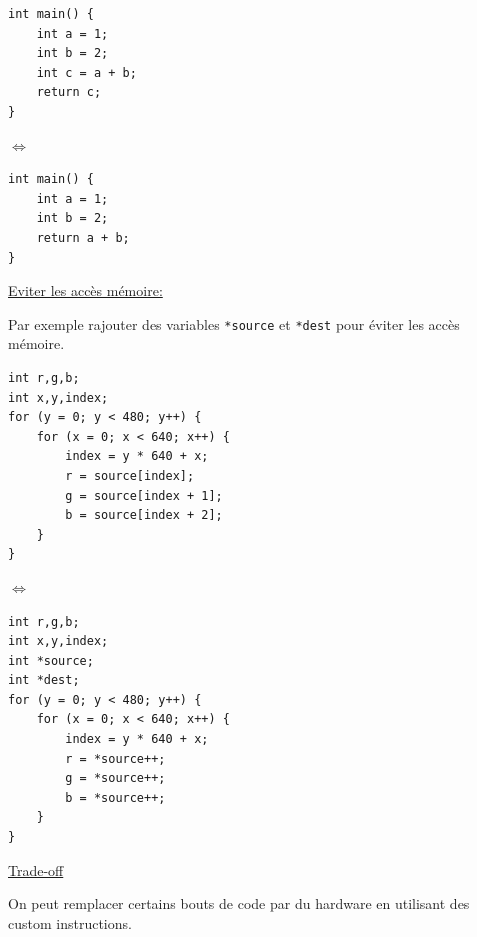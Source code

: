 \begin{minipage}{0.49\columnwidth}
    \begin{verbatim}
int main() {
    int a = 1;
    int b = 2;
    int c = a + b;
    return c;
}
\end{verbatim}
\end{minipage}
$\Longleftrightarrow $
\begin{minipage}{0.49\columnwidth}
    \begin{verbatim}
int main() {
    int a = 1;
    int b = 2;
    return a + b;
}
\end{verbatim}
\end{minipage}

\underline{Eviter les accès mémoire:}

Par exemple rajouter des variables \texttt{*source} et \texttt{*dest} pour éviter les accès mémoire.

\begin{minipage}{0.49\columnwidth}
    \begin{verbatim}
int r,g,b;
int x,y,index;
for (y = 0; y < 480; y++) {
    for (x = 0; x < 640; x++) {
        index = y * 640 + x;
        r = source[index];
        g = source[index + 1];
        b = source[index + 2];
    }
}
\end{verbatim}
\end{minipage}
$\Longleftrightarrow $
\begin{minipage}{0.49\columnwidth}
    \begin{verbatim}
int r,g,b;
int x,y,index;
int *source;
int *dest;
for (y = 0; y < 480; y++) {
    for (x = 0; x < 640; x++) {
        index = y * 640 + x;
        r = *source++;
        g = *source++;
        b = *source++;
    }
}
\end{verbatim}
\end{minipage}

\columnbreak

\underline{Trade-off}

On peut remplacer certains bouts de code par du hardware en utilisant des
custom instructions.

